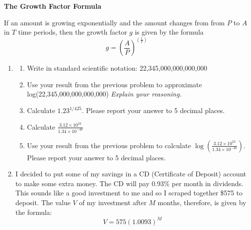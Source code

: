 \documentclass[12pt]{article}
\begin{document}
 \vspace{.2in}
 
 \begin{center}
\textbf{The Growth Factor Formula}
\vspace{.1in}

If an amount is growing exponentially and the amount changes from from $P$ to $A$ \\ in $T$ time periods, then the growth factor $g$ is given by the formula $$g=\left(\frac{A}{P}\right)^{\left(\frac{1}{T}\right)}$$

 \end{center}

\hrulefill

\newpage

\begin{enumerate}
\item \begin{enumerate}
\item Write in standard scientific notation:  22,345,000,000,000,000
\vfill
\item Use your result from the previous problem to approximate log(22,345,000,000,000,000)  \emph{Explain your reasoning.}
\vfill
\item Calculate $1.23^{1/425}$. Please report your answer to 5 decimal places.
\vfill
\item Calculate $\displaystyle \frac{3.12 \times 10^{23}}{1.34 \times 10^{-40}} $
\vfill
\item Use your result from the previous problem to calculate $\displaystyle \log \left( \frac{3.12 \times 10^{23}}{1.34 \times 10^{-40}} \right) $.  Please report your answer to 5 decimal places.
\vfill
\end{enumerate}

\newpage
\item I decided to put some of my savings in a CD (Certificate of Deposit) account to make some extra money.  The CD will pay 0.93\% per month in dividends.  This sounds like a good investment to me and so I scraped together \$575 to deposit.  The value $V$ of my investment after $M$ months, therefore, is given by the formula: $$V=575(1.0093)^M$$


\end{enumerate}
\end{document}
